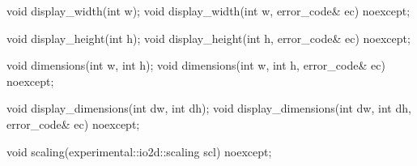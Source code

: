 \begin{itemdecl}
    void display_width(int w);
    void display_width(int w, error_code& ec) noexcept;
\end{itemdecl}
\begin{itemdescr}
	\pnum
	\effects
	
	\pnum
	\postconditions
	
\end{itemdescr}

\begin{itemdecl}
    void display_height(int h);
    void display_height(int h, error_code& ec) noexcept;
\end{itemdecl}
\begin{itemdescr}
	\pnum
	\effects
	
	\pnum
	\postconditions
	
\end{itemdescr}

\begin{itemdecl}
    void dimensions(int w, int h);
    void dimensions(int w, int h, error_code& ec) noexcept;
\end{itemdecl}
\begin{itemdescr}
	\pnum
	\effects
	
	\pnum
	\postconditions
	
\end{itemdescr}

\begin{itemdecl}
    void display_dimensions(int dw, int dh);
    void display_dimensions(int dw, int dh, error_code& ec) noexcept;
\end{itemdecl}
\begin{itemdescr}
	\pnum
	\effects
	
	\pnum
	\postconditions
	
\end{itemdescr}

\begin{itemdecl}
    void scaling(experimental::io2d::scaling scl) noexcept;
\end{itemdecl}
\begin{itemdescr}
	\pnum
	\effects
	
	\pnum
	\postconditions
	
\end{itemdescr}

